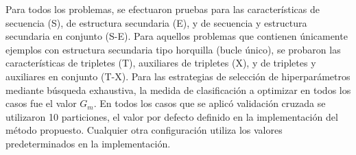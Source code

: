 Para todos los problemas, se efectuaron pruebas para las
características de secuencia (S), de estructura secundaria (E), y de
secuencia y estructura secundaria en conjunto (S-E).  Para aquellos
problemas que contienen únicamente ejemplos con estructura secundaria
tipo horquilla (bucle único), se probaron las características de
tripletes (T), auxiliares de tripletes (X), y de tripletes y
auxiliares en conjunto (T-X).
Para las estrategias de selección de hiperparámetros mediante búsqueda
exhaustiva, la medida de clasificación a optimizar en todos los casos
fue el valor $G_m$. En todos los casos que se aplicó validación
cruzada se utilizaron 10 particiones, el valor por defecto definido en
la implementación del método propuesto. Cualquier otra configuración
utiliza los valores predeterminados en la implementación.